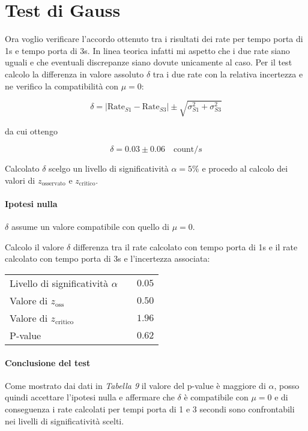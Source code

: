 \documentclass{article}
\begin{document}
\newpage
\section{Test di Gauss}
Ora voglio verificare l'accordo ottenuto tra i risultati dei rate per tempo porta di 1s e tempo porta di 3s. In linea teorica infatti mi aspetto che i due rate siano uguali e che eventuali discrepanze siano dovute unicamente al caso. Per il test calcolo la differenza in valore assoluto $\delta$ tra i due rate con la relativa incertezza e ne verifico la compatibilità con $\mu = 0$:


\[
	\delta = \left| \text{Rate}_{S1} - \text{Rate}_{S3} \right| \pm  \sqrt{\sigma_{S1}^2 + \sigma_{S3}^2}
\]

da cui ottengo

\[
	\delta = 0.03 \pm 0.06 \quad \text{count}/s	
\]

Calcolato $\delta$ scelgo un livello di significatività $\alpha = 5\%$ e procedo al calcolo dei valori di $z_{\text{osservato}}$ e $z_{\text{critico}}$.

\paragraph{Ipotesi nulla} $\delta$ assume un valore compatibile con quello di $\mu = 0$. 


\noindent
Calcolo il valore $\delta$ differenza tra il rate calcolato con tempo porta di 1s e il rate calcolato con tempo porta di 3s e l'incertezza associata:

\vspace{0.2cm}
\begin{center}
\begin{tabular}{lr}
	Livello di significatività $\alpha$	& $\quad 0.05$  \\
	Valore di $z_\text{oss}$             	& $\quad 0.50$  \\
	Valore di $z_{\text{critico}}$ 		& $\quad 1.96$  \\
	P-value 				& $\quad 0.62$  
\end{tabular}
\end{center}

\paragraph{Conclusione del test} Come mostrato dai dati in \textit{Tabella 9} il valore del p-value è maggiore di $\alpha$, posso quindi accettare l'ipotesi nulla e affermare che $\delta$ è compatibile con $\mu = 0$ e di conseguenza i rate calcolati per tempi porta di 1 e 3 secondi sono confrontabili nei livelli di significatività scelti.  
\end{document}
